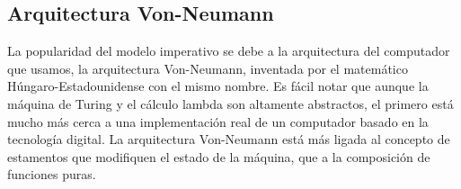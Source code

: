 	\subsection{Arquitectura Von-Neumann}
	La popularidad del modelo imperativo se debe a la arquitectura del computador que usamos, la arquitectura Von-Neumann, inventada por el matemático Húngaro-Estadounidense con el mismo nombre. Es fácil notar que aunque la máquina de Turing y el cálculo lambda son altamente abstractos, el primero está mucho más cerca a una implementación real de un computador basado en la tecnología digital. La arquitectura Von-Neumann está más ligada al concepto de estamentos que modifiquen el estado de la máquina, que a la composición de funciones puras.\\\\
	
